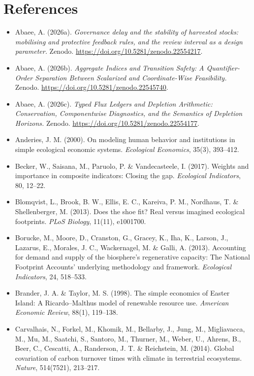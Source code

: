 \documentclass[11pt]{article}
\begin{document}
\section{References}

\begin{itemize}
\item Abaee, A. (2026a). \emph{Governance delay and the stability of harvested stocks: mobilising and protective feedback rules, and the review interval as a design parameter.} Zenodo. \url{https://doi.org/10.5281/zenodo.22554217}.
\item Abaee, A. (2026b). \emph{Aggregate Indices and Transition Safety: A Quantifier-Order Separation Between Scalarized and Coordinate-Wise Feasibility.} Zenodo. \url{https://doi.org/10.5281/zenodo.22545740}.
\item Abaee, A. (2026c). \emph{Typed Flux Ledgers and Depletion Arithmetic: Conservation, Componentwise Diagnostics, and the Semantics of Depletion Horizons.} Zenodo. \url{https://doi.org/10.5281/zenodo.22554177}.
\item Anderies, J. M. (2000). On modeling human behavior and institutions in simple ecological economic systems. \emph{Ecological Economics}, 35(3), 393--412.
\item Becker, W., Saisana, M., Paruolo, P. \& Vandecasteele, I. (2017). Weights and importance in composite indicators: Closing the gap. \emph{Ecological Indicators}, 80, 12--22.
\item Blomqvist, L., Brook, B. W., Ellis, E. C., Kareiva, P. M., Nordhaus, T. \& Shellenberger, M. (2013). Does the shoe fit? Real versus imagined ecological footprints. \emph{PLoS Biology}, 11(11), e1001700.
\item Borucke, M., Moore, D., Cranston, G., Gracey, K., Iha, K., Larson, J., Lazarus, E., Morales, J. C., Wackernagel, M. \& Galli, A. (2013). Accounting for demand and supply of the biosphere's regenerative capacity: The National Footprint Accounts' underlying methodology and framework. \emph{Ecological Indicators}, 24, 518--533.
\item Brander, J. A. \& Taylor, M. S. (1998). The simple economics of Easter Island: A Ricardo--Malthus model of renewable resource use. \emph{American Economic Review}, 88(1), 119--138.
\item Carvalhais, N., Forkel, M., Khomik, M., Bellarby, J., Jung, M., Migliavacca, M., Mu, M., Saatchi, S., Santoro, M., Thurner, M., Weber, U., Ahrens, B., Beer, C., Cescatti, A., Randerson, J. T. \& Reichstein, M. (2014). Global covariation of carbon turnover times with climate in terrestrial ecosystems. \emph{Nature}, 514(7521), 213--217.

\end{itemize}
\end{document}
